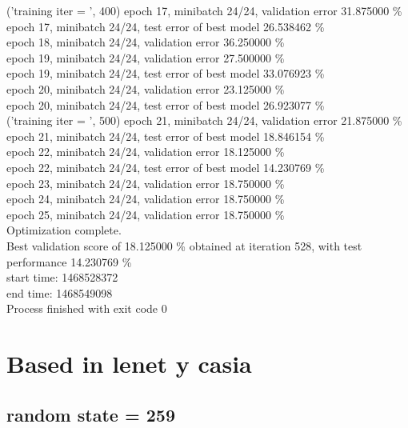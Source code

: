 \documentclass[a4paper]{article}
\begin{document}
('training \@ iter = ', 400)
epoch 17, minibatch 24/24, validation error 31.875000 \% \\
     epoch 17, minibatch 24/24, test error of best model 26.538462 \% \\
epoch 18, minibatch 24/24, validation error 36.250000 \% \\
epoch 19, minibatch 24/24, validation error 27.500000 \% \\
     epoch 19, minibatch 24/24, test error of best model 33.076923 \% \\
epoch 20, minibatch 24/24, validation error 23.125000 \% \\
     epoch 20, minibatch 24/24, test error of best model 26.923077 \% \\
('training \@ iter = ', 500)
epoch 21, minibatch 24/24, validation error 21.875000 \% \\
     epoch 21, minibatch 24/24, test error of best model 18.846154 \% \\
epoch 22, minibatch 24/24, validation error 18.125000 \% \\
     epoch 22, minibatch 24/24, test error of best model 14.230769 \% \\
epoch 23, minibatch 24/24, validation error 18.750000 \% \\
epoch 24, minibatch 24/24, validation error 18.750000 \% \\
epoch 25, minibatch 24/24, validation error 18.750000 \% \\
Optimization complete.\\
Best validation score of 18.125000 \% obtained at iteration 528, with test performance 14.230769 \% \\
start time: 1468528372\\
end time: 1468549098\\

Process finished with exit code 0 \\

\section{Based in lenet y casia}

\subsection{random state = 259 }
\end{document}
